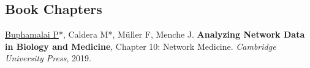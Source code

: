 \documentclass[margin,line]{resume}
\begin{document}
\begin{resume}
     \section{\mysidestyle Book Chapters}
 \underline{Buphamalai P}*, Caldera M*, M{\"u}ller F, Menche J. \textbf{Analyzing Network Data in Biology and Medicine}, Chapter 10: Network Medicine. \textit{Cambridge University Press}, 2019.



    

\end{resume}
\end{document}
